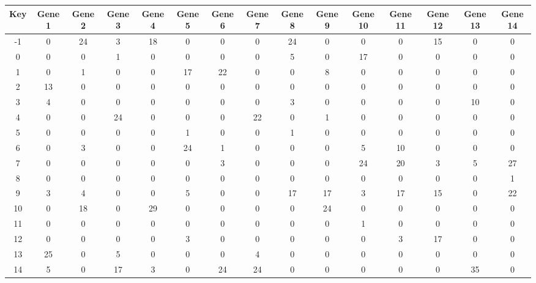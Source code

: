 \begin{tabular}{|c|c|c|c|c|c|c|c|c|c|c|c|c|c|c|}
\hline
Key & Gene 1 & Gene 2 & Gene 3 & Gene 4 & Gene 5 & Gene 6 & Gene 7 & Gene 8 & Gene 9 & Gene 10 & Gene 11 & Gene 12 & Gene 13 & Gene 14 \\
\hline
-1 & 0 & 24 & 3 & 18 & 0 & 0 & 0 & 24 & 0 & 0 & 0 & 15 & 0 & 0 \\
0 & 0 & 0 & 1 & 0 & 0 & 0 & 0 & 5 & 0 & 17 & 0 & 0 & 0 & 0 \\
1 & 0 & 1 & 0 & 0 & 17 & 22 & 0 & 0 & 8 & 0 & 0 & 0 & 0 & 0 \\
2 & 13 & 0 & 0 & 0 & 0 & 0 & 0 & 0 & 0 & 0 & 0 & 0 & 0 & 0 \\
3 & 4 & 0 & 0 & 0 & 0 & 0 & 0 & 3 & 0 & 0 & 0 & 0 & 10 & 0 \\
4 & 0 & 0 & 24 & 0 & 0 & 0 & 22 & 0 & 1 & 0 & 0 & 0 & 0 & 0 \\
5 & 0 & 0 & 0 & 0 & 1 & 0 & 0 & 1 & 0 & 0 & 0 & 0 & 0 & 0 \\
6 & 0 & 3 & 0 & 0 & 24 & 1 & 0 & 0 & 0 & 5 & 10 & 0 & 0 & 0 \\
7 & 0 & 0 & 0 & 0 & 0 & 3 & 0 & 0 & 0 & 24 & 20 & 3 & 5 & 27 \\
8 & 0 & 0 & 0 & 0 & 0 & 0 & 0 & 0 & 0 & 0 & 0 & 0 & 0 & 1 \\
9 & 3 & 4 & 0 & 0 & 5 & 0 & 0 & 17 & 17 & 3 & 17 & 15 & 0 & 22 \\
10 & 0 & 18 & 0 & 29 & 0 & 0 & 0 & 0 & 24 & 0 & 0 & 0 & 0 & 0 \\
11 & 0 & 0 & 0 & 0 & 0 & 0 & 0 & 0 & 0 & 1 & 0 & 0 & 0 & 0 \\
12 & 0 & 0 & 0 & 0 & 3 & 0 & 0 & 0 & 0 & 0 & 3 & 17 & 0 & 0 \\
13 & 25 & 0 & 5 & 0 & 0 & 0 & 4 & 0 & 0 & 0 & 0 & 0 & 0 & 0 \\
14 & 5 & 0 & 17 & 3 & 0 & 24 & 24 & 0 & 0 & 0 & 0 & 0 & 35 & 0 \\
\hline
\end{tabular}